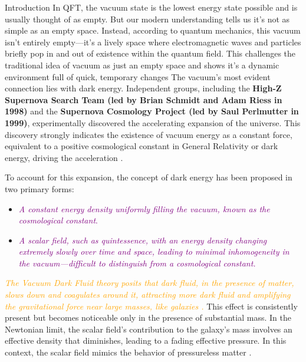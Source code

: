 \documentclass[aspectratio=169,xcolor=dvipsnames, t]{beamer}
\begin{document}
\begin{frame}{Introduction}
In QFT, the vacuum state is the lowest energy state possible and is usually thought of as empty. But our modern understanding tells us it's not as simple as an empty space. Instead, according to quantum mechanics, this vacuum isn't entirely empty—it's a lively space where electromagnetic waves and particles briefly pop in and out of existence within the quantum field. This challenges the traditional idea of vacuum as just an empty space and shows it's a dynamic environment full of quick, temporary changes \cite{rugh2000quantum,PhysRevFocus1998}
    The vacuum's most evident connection lies with dark energy. Independent groups, including the \textbf{High-Z Supernova Search Team (led by Brian Schmidt and Adam Riess in 1998)} and the \textbf{Supernova Cosmology Project (led by Saul Perlmutter in 1999)}, experimentally discovered the accelerating expansion of the universe. This discovery strongly indicates the existence of vacuum energy as a constant force, equivalent to a positive cosmological constant in General Relativity or dark energy, driving the acceleration \cite{Frieman_Turner_Huterer_2008}.
\end{frame}
\begin{frame}
To account for this expansion, the concept of dark energy has been proposed in two primary forms:
\begin{itemize}
\item \textcolor{purple}{\textit{A constant energy density uniformly filling the vacuum, known as the cosmological constant}.}
\item \textcolor{purple}{\textit{A scalar field, such as quintessence, with an energy density changing extremely slowly over time and space, leading to minimal inhomogeneity in the vacuum—difficult to distinguish from a cosmological constant.}}
\end{itemize}


\textcolor{orange}{\textit{The Vacuum Dark Fluid theory posits that dark fluid, in the presence of matter, slows down and coagulates around it, attracting more dark fluid and amplifying the gravitational force near large masses, like galaxies \cite{Astrophysics_Betts}.}} This effect is consistently present but becomes noticeable only in the presence of substantial mass. {In the Newtonian limit, the scalar field's contribution to the galaxy's mass involves an effective density that diminishes, leading to a fading effective pressure.} In this context, the scalar field mimics the behavior of pressureless matter \cite{Arbey_2006}.
\end{frame}
\end{document}
